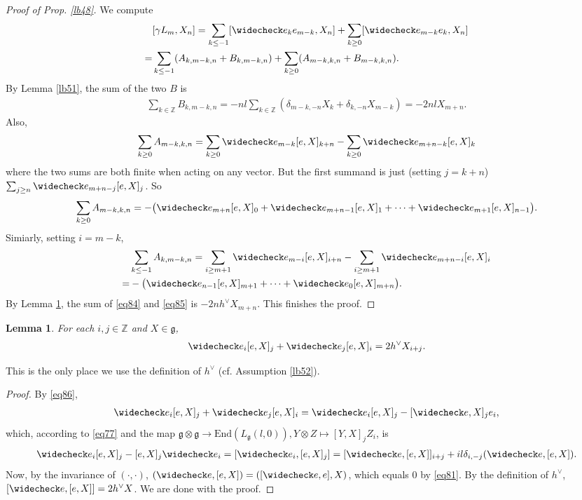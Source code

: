 \documentclass[12pt,a4paper,notitlepage]{article}
\theoremstyle{definition}
\theoremstyle{plain}
\newtheorem{lm}[df]{Lemma}
\newcommand{\wch}{\widecheck}
\newcommand{\End}{\mathrm{End}} %
\newcommand{\gk}{\mathfrak g}
\newcommand{\Zbb}{\mathbb Z}
\numberwithin{equation}{section}
\begin{document}
\begin{proof}[Proof of Prop. \ref{lb48}]
We compute
\begin{align*}
&[\gamma L_m,X_n]=\sum_{k\leq-1}[\wch e_ke_{m-k},X_n]+\sum_{k\geq0}[\wch e_{m-k}e_k,X_n]\\
=&\sum_{k\leq-1}(A_{k,m-k,n}+B_{k,m-k,n})+\sum_{k\geq0}(A_{m-k,k,n}+B_{m-k,k,n}).	
\end{align*}
By Lemma \ref{lb51}, the sum of the two  $B$ is
\begin{align*}
\sum_{k\in\Zbb}B_{k,m-k,n}=-nl\sum_{k\in\Zbb} (\delta_{m-k,-n}X_k+\delta_{k,-n}X_{m-k})=-2nl X_{m+n}.
\end{align*}
Also,
\begin{align*}
\sum_{k\geq 0}A_{m-k,k,n}=\sum_{k\geq0}\wch e_{m-k}[e,X]_{k+n}-\sum_{k\geq 0}\wch e_{m+n-k}[e,X]_k	
\end{align*}
where the two sums are both finite when acting on any vector. But the first summand is just (setting $j=k+n$) $\sum_{j\geq n}\wch e_{m+n-j}[e,X]_j$. So
\begin{align}
\sum_{k\geq 0}A_{m-k,k,n}=-\big(\wch e_{m+n}[e,X]_0+\wch e_{m+n-1}[e,X]_1+\cdots+\wch e_{m+1}[e,X]_{n-1}\big).	\label{eq84}
\end{align}
Simiarly, setting $i=m-k$,
\begin{align}
&\sum_{k\leq-1}A_{k,m-k,n}=\sum_{i\geq m+1}\wch e_{m-i}[e,X]_{i+n}-\sum_{i\geq m+1}\wch e_{m+n-i}[e,X]_i\nonumber\\
=&-\big(\wch e_{n-1}[e,X]_{m+1}+\cdots+\wch e_0[e,X]_{m+n} \big).	\label{eq85}
\end{align}
By Lemma \ref{lb53}, the sum of \eqref{eq84} and \eqref{eq85} is $-2nh^\vee X_{m+n}$. This finishes the proof.
\end{proof}


\begin{lm}\label{lb53}
For each $i,j\in\Zbb$ and $X\in\gk$,
\begin{align}
\wch e_i[e,X]_j+\wch e_j[e,X]_i=2h^\vee X_{i+j}.	
\end{align}
\end{lm}
This is the only place we use the definition of $h^\vee$ (cf. Assumption \ref{lb52}).

\begin{proof}
By \eqref{eq86},
\begin{align*}
\wch e_i[e,X]_j+\wch e_j[e,X]_i=\wch e_i[e,X]_j-[\wch e,X]_je_i,	
\end{align*}
which, according to \eqref{eq77} and the map $\gk\otimes\gk\rightarrow\End(L_\gk(l,0)),Y\otimes Z\mapsto [Y,X]_jZ_i$, is
\begin{align*}
\wch e_i[e,X]_j-[e,X]_j \wch e_i=[\wch e_i,[e,X]_j]=[\wch e,[e,X]]_{i+j}+il\delta_{i,-j}(\wch e,[e,X]).
\end{align*}
Now, by the invariance of $(\cdot,\cdot)$, $(\wch e,[e,X])=([\wch e,e],X)$, which equals $0$ by \eqref{eq81}. By the definition of $h^\vee$, $[\wch e,[e,X]]=2h^\vee X$. We are done with the proof.
\end{proof}
\end{document}
